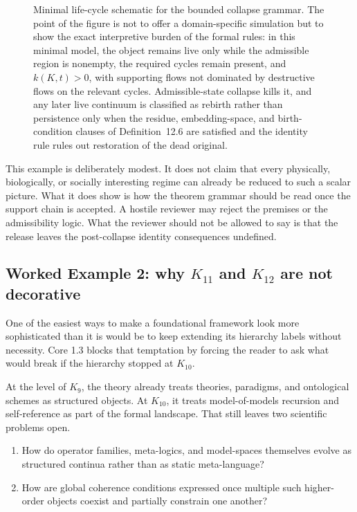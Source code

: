\begin{figure}[htbp]
\centering

\caption{Minimal life-cycle schematic for the bounded collapse grammar. The point of the figure is
not to offer a domain-specific simulation but to show the exact interpretive burden of the formal
rules: in this minimal model, the object remains live only while the
admissible region is nonempty, the required cycles remain present, and
\(k(K,t)>0\), with supporting flows not dominated by destructive flows on the
relevant cycles. Admissible-state collapse kills it, and any later live continuum
is classified as rebirth rather than persistence only when the residue,
embedding-space, and birth-condition clauses of Definition~12.6 are satisfied
and the identity rule rules out restoration of the dead original.}
\label{fig:oc13-birth-life-death}
\end{figure}

This example is deliberately modest. It does not claim that every physically, biologically, or
socially interesting regime can already be reduced to such a scalar picture. What it does show is
how the theorem grammar should be read once the support chain is accepted. A hostile reviewer may
reject the premises or the admissibility logic. What the reviewer should not be allowed to say is
that the release leaves the post-collapse identity consequences undefined.

\subsection{Worked Example 2: why \texorpdfstring{$K_{11}$}{K11} and \texorpdfstring{$K_{12}$}{K12} are not decorative}

One of the easiest ways to make a foundational framework look more sophisticated than it is would
be to keep extending its hierarchy labels without necessity. Core 1.3 blocks that temptation by
forcing the reader to ask what would break if the hierarchy stopped at \(K_{10}\).

At the level of \(K_9\), the theory already treats theories, paradigms, and ontological schemes as
structured objects. At \(K_{10}\), it treats model-of-models recursion and self-reference as part
of the formal landscape. That still leaves two scientific problems open.

\begin{enumerate}
\item How do operator families, meta-logics, and model-spaces themselves evolve as structured
      continua rather than as static meta-language?
\item How are global coherence conditions expressed once multiple such higher-order objects coexist
      and partially constrain one another?
\end{enumerate}

